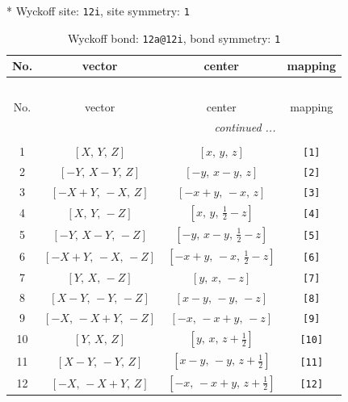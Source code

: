 \documentclass[fleqn,8pt]{jsarticle}
\begin{document}
* Wyckoff site: {\tt 12i}, site symmetry: {\tt 1}
\renewcommand{\arraystretch}{1.2}
\begin{longtable}{cccc}
\caption{Wyckoff bond: {\tt 12a@12i}, bond symmetry: {\tt 1}}
 \\
 \hline \hline
No. & vector & center & mapping \\ \hline \endfirsthead

\multicolumn{3}{l}{\tablename\ \thetable{}} \\
 \hline \hline
No. & vector & center & mapping \\ \hline \endhead

 \hline \hline
\multicolumn{3}{r}{\footnotesize\it continued ...} \\ \endfoot

 \hline \hline
\multicolumn{3}{r}{} \\ \endlastfoot

1 & $\left[ X,\, Y,\, Z \right]$ & $\left[ x,\, y,\, z \right]$ & {\tt [1]} \\ \hline
2 & $\left[ - Y,\, X - Y,\, Z \right]$ & $\left[ - y,\, x - y,\, z \right]$ & {\tt [2]} \\ \hline
3 & $\left[ - X + Y,\, - X,\, Z \right]$ & $\left[ - x + y,\, - x,\, z \right]$ & {\tt [3]} \\ \hline
4 & $\left[ X,\, Y,\, - Z \right]$ & $\left[ x,\, y,\, \frac{1}{2} - z \right]$ & {\tt [4]} \\ \hline
5 & $\left[ - Y,\, X - Y,\, - Z \right]$ & $\left[ - y,\, x - y,\, \frac{1}{2} - z \right]$ & {\tt [5]} \\ \hline
6 & $\left[ - X + Y,\, - X,\, - Z \right]$ & $\left[ - x + y,\, - x,\, \frac{1}{2} - z \right]$ & {\tt [6]} \\ \hline
7 & $\left[ Y,\, X,\, - Z \right]$ & $\left[ y,\, x,\, - z \right]$ & {\tt [7]} \\ \hline
8 & $\left[ X - Y,\, - Y,\, - Z \right]$ & $\left[ x - y,\, - y,\, - z \right]$ & {\tt [8]} \\ \hline
9 & $\left[ - X,\, - X + Y,\, - Z \right]$ & $\left[ - x,\, - x + y,\, - z \right]$ & {\tt [9]} \\ \hline
10 & $\left[ Y,\, X,\, Z \right]$ & $\left[ y,\, x,\, z + \frac{1}{2} \right]$ & {\tt [10]} \\ \hline
11 & $\left[ X - Y,\, - Y,\, Z \right]$ & $\left[ x - y,\, - y,\, z + \frac{1}{2} \right]$ & {\tt [11]} \\ \hline
12 & $\left[ - X,\, - X + Y,\, Z \right]$ & $\left[ - x,\, - x + y,\, z + \frac{1}{2} \right]$ & {\tt [12]} \\
\end{longtable}
\end{document}
